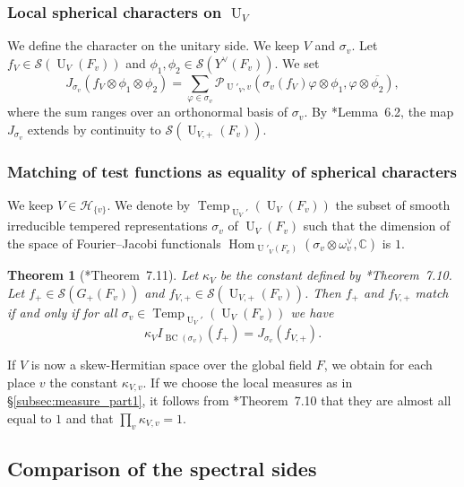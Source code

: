 \documentclass[letterpaper,11pt]{amsart}
\newcommand{\C}{\mathbb{C}}
\newcommand{\cH}{\mathcal{H}}
\newcommand{\cP}{\mathcal{P}}
\newcommand{\cS}{\mathcal{S}}
\newcommand{\<}{\negthickspace}
\DeclareMathOperator{\U}{U}
\DeclareMathOperator{\Hom}{Hom}
\DeclareMathOperator{\BC}{BC}
\DeclareMathOperator{\Temp}{Temp} \DeclareMathOperator{\temp}{temp}
\theoremstyle{definition}
\theoremstyle{plain}
\newtheorem{theorem}[definition]{Theorem}
\theoremstyle{remark}
\numberwithin{equation}{section}
\begin{document}
\subsubsection{Local spherical characters on $\U_V$}
We define the character on the unitary side. We keep $V$ and $\sigma_v$. Let $f_{V} \in \cS(\U_V(F_v))$ and $\phi_1, \phi_2 \in \cS(Y^\vee(F_v))$. We set 
\begin{equation}
    \label{eq:local_spheri_char_u}
    J_{\sigma_v}(f_V \otimes \phi_1 \otimes \phi_2)=\sum_{\varphi \in \sigma_v} \cP_{\U'_V,v}(\sigma_v(f_V)\varphi \otimes \phi_1,\varphi \otimes \overline{\phi_2}),
\end{equation}
where the sum ranges over an orthonormal basis of $\sigma_v$. By \cite{BLX2}*{Lemma~6.2}, the map $J_{\sigma_v}$ extends by continuity to $\cS(\U_{V,+}(F_v))$.


\subsubsection{Matching of test functions as equality of spherical characters}

We keep $V \in \cH_{\{v\}}$. We denote by $\Temp_{\U_V'}(\U_V(F_v))$ the subset of smooth irreducible tempered representations $\sigma_v$ of $\U_V(F_v)$ such that the dimension of the space of Fourier--Jacobi functionals $\Hom_{\U'_V(F_v)}(\sigma_v \otimes \omega_v^\vee,\C)$ is $1$. 

\begin{theorem}[\cite{BLX2}*{Theorem~7.11}]
    \label{thm:spectral_transfer}
    Let $\kappa_V$ be the constant defined by \cite{BLX2}*{Theorem~7.10}. Let $f_+ \in \cS(G_+(F_v))$ and $f_{V,+} \in \cS(\U_{V,+}(F_v))$. Then $f_+$ and $f_{V,+}$ match if and only if for all $\sigma_v \in \Temp_{\U_V'}(\U_V(F_v))$ we have
    \begin{equation*}
        \kappa_V I_{\BC(\sigma_v)}(f_+)=J_{\sigma_v}(f_{V,+}).
    \end{equation*}
\end{theorem}

If $V$ is now a skew-Hermitian space over the global field $F$, we obtain for each place $v$ the constant $\kappa_{V,v}$. If we choose the local measures as in \S\ref{subsec:measure_part1}, it follows from \cite{BLX2}*{Theorem~7.10} that they are almost all equal to $1$ and that $\prod_v \kappa_{V,v}=1$.

\subsection{Comparison of the spectral sides}
\label{sec:comparison_spectral}
\end{document}
